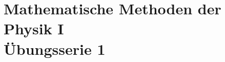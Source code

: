\documentclass[a4paper,fleqn]{article}
\begin{document}

	\section*{\centering Mathematische Methoden der Physik I \\ Übungsserie 1}

	
	
	
\end{document}
